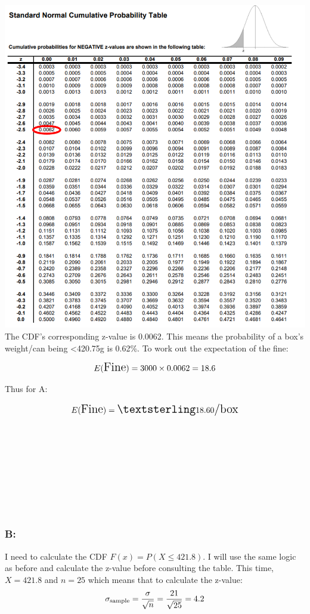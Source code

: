 \documentclass[
]{article}
\begin{document}
\includegraphics{images/ztable.png}\\

The CDF's corresponding z-value is 0.0062. This means the probability of
a box's weight/can being \textless420.75g is 0.62\%. To work out the
expectation of the fine:

\[
\Large
E(\text{Fine}) = 3000 \times 0.0062 = 18.6
\]

Thus for A:

\[
\Large
E(\text{Fine})=£18.60\text{/box}
\]\\
\strut \\
\strut \\
\strut \\
\strut \\

\subsubsection{B:}\label{b}

I need to calculate the CDF \(F(x) = P(X ≤ 421.8)\). I will use the same
logic as before and calculate the z-value before consulting the table.
This time, \(X = 421.8\) and \(n = 25\) which means that to calculate
the z-value: \[
\Large
\sigma_{\text{sample}} = \frac{\sigma}{\sqrt{n}} = \frac{21}{\sqrt{25}} = 4.2
\]
\end{document}
